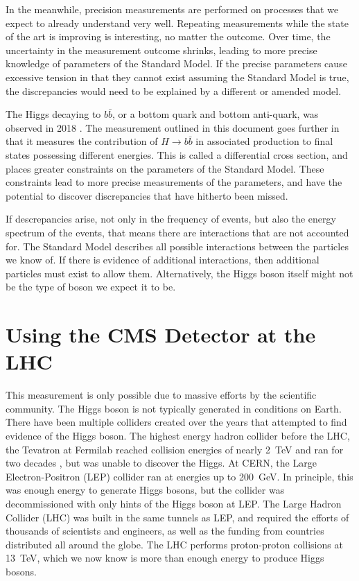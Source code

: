 In the meanwhile, precision measurements are performed on
processes that we expect to already understand very well.
Repeating measurements while the state of the art is improving is interesting,
no matter the outcome.
Over time, the uncertainty in the measurement outcome shrinks,
leading to more precise knowledge of parameters of the Standard Model.
If the precise parameters cause excessive tension in that they cannot exist
assuming the Standard Model is true,
the discrepancies would need to be explained by a different or amended model.

The Higgs decaying to $b\bar{b}$, or a bottom quark and bottom anti-quark,
was observed in 2018 \cite{obs-18, Aaboud_2018}.
The measurement outlined in this document goes further in that
it measures the contribution of $H \rightarrow b\bar{b}$ in associated production
to final states possessing different energies.
This is called a differential cross section,
and places greater constraints on the parameters of the Standard Model.
These constraints lead to more precise measurements of the parameters,
and have the potential to discover discrepancies that have hitherto been missed.

If descrepancies arise, not only in the frequency of events,
but also the energy spectrum of the events,
that means there are interactions that are not accounted for.
The Standard Model describes all possible interactions between the particles we know of.
If there is evidence of additional interactions, then additional particles must exist to allow them.
Alternatively, the Higgs boson itself might not be the type of boson we expect it to be.

\section{Using the CMS Detector at the LHC}

This measurement is only possible due to massive efforts by the scientific community.
The Higgs boson is not typically generated in conditions on Earth.
There have been multiple colliders created over the years that attempted to find evidence of the Higgs boson.
The highest energy hadron collider before the LHC,
the Tevatron at Fermilab reached collision energies of nearly \SI{2}{TeV}
and ran for two decades \cite{Holmes_2011}, but was unable to discover the Higgs.
At CERN, the Large Electron-Positron (LEP) collider \cite{Myers:226776} ran at energies up to \SI{200}{GeV}.
In principle, this was enough energy to generate Higgs bosons,
but the collider was decommissioned with only hints of the Higgs boson at LEP.
The Large Hadron Collider (LHC) was built in the same tunnels as LEP, and
required the efforts of thousands of scientists and engineers,
as well as the funding from countries distributed all around the globe.
The LHC performs proton-proton collisions at \SI{13}{TeV},
which we now know is more than enough energy to produce Higgs bosons.

